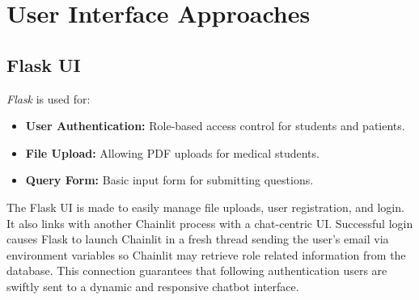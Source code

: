 \section{User Interface Approaches}
\label{sec:user_interface}

\subsection{Flask UI}
\label{subsec:flask_ui}
\emph{Flask} is used for:
\begin{itemize}[itemsep=2em]
    \item \textbf{User Authentication:} Role-based access control for students and patients.
    \item \textbf{File Upload:} Allowing PDF uploads for medical students.
    \item \textbf{Query Form:} Basic input form for submitting questions.
\end{itemize}

The Flask UI is made to easily manage file uploads, user registration, and login.  It also links with another Chainlit process with a chat-centric UI.  Successful login causes Flask to launch Chainlit in a fresh thread sending the user's email via environment variables so Chainlit may retrieve role related information from the database.  This connection guarantees that following authentication users are swiftly sent to a dynamic and responsive chatbot interface.


